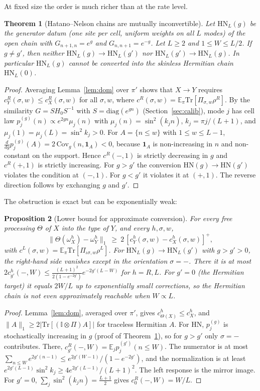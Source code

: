 \documentclass[11pt]{article}
\newtheorem{theorem}{Theorem}
\newtheorem{proposition}[theorem]{Proposition}
\theoremstyle{definition}
\theoremstyle{remark}
\newcommand{\Tr}{\mathrm{Tr}}
\newcommand{\E}{\mathbb{E}}
\newcommand{\one}{\mathbb{I}}
\newcommand{\isig}{\iota\sigma}
\begin{document}
At fixed size the order is much richer than at the rate level.

\begin{theorem}[Hatano--Nelson chains are mutually inconvertible]\label{thm:HNinc}
Let $\mathrm{HN}_L(g)$ be the generator datum (one site per cell, uniform weights on all $L$ modes) of the open chain with $G_{n+1,n}=e^{g}$ and $G_{n,n+1}=e^{-g}$. Let $L\ge2$ and $1\le W\le L/2$. If $g\ne g'$, then neither $\mathrm{HN}_L(g)\to\mathrm{HN}_L(g')$ nor $\mathrm{HN}_L(g')\to\mathrm{HN}_L(g)$. In particular $\mathrm{HN}_L(g)$ cannot be converted into the skinless Hermitian chain $\mathrm{HN}_L(0)$.
\end{theorem}
\begin{proof}
Averaging Lemma~\ref{lem:dom} over $\pi'$ shows that $X\to Y$ requires $c^R_Y(\sigma,w)\le c^R_X(\sigma,w)$ for all $\sigma,w$, where $c^R(\sigma,w)=\E_\pi\Tr[\Pi_{\sigma,w}\rho^R]$. By the similarity $G=SH_0S^{-1}$ with $S=\mathrm{diag}(e^{gn})$ (Section~\ref{sec:calib}), mode $j$ has cell law $p^{(g)}_j(n)\propto e^{2gn}\mu_j(n)$ with $\mu_j(n)=\sin^2(k_jn)$, $k_j=\pi j/(L+1)$, and $\mu_j(1)=\mu_j(L)=\sin^2k_j>0$. For $A=\{n\le w\}$ with $1\le w\le L-1$, $\frac{d}{dg}p^{(g)}_j(A)=2\,\mathrm{Cov}_g(n,\mathbf 1_A)<0$, because $\mathbf 1_A$ is non-increasing in $n$ and non-constant on the support. Hence $c^R(-,1)$ is strictly decreasing in $g$ and $c^R(+,1)$ is strictly increasing. For $g>g'$ the conversion $\mathrm{HN}(g)\to\mathrm{HN}(g')$ violates the condition at $(-,1)$. For $g<g'$ it violates it at $(+,1)$. The reverse direction follows by exchanging $g$ and $g'$.
\end{proof}

The obstruction is exact but can be exponentially weak:

\begin{proposition}[Lower bound for approximate conversion]\label{prop:approx}
For every free processing $\Theta$ of $X$ into the type of $Y$, and every $h,\sigma,w$,
\[
\|\Theta(\omega^h_X)-\omega^h_Y\|_1\ \ge\ 2\,[c^h_Y(\sigma,w)-c^h_X(\sigma,w)]^+ ,
\]
with $c^L(\sigma,w)=\E_\pi\Tr[\Pi_{\isig,w}\rho^L]$. For $\mathrm{HN}_L(g)\to\mathrm{HN}_L(g')$ with $g>g'>0$, the right-hand side vanishes except in the orientation $\sigma=-$. There it is at most $2c^h_{g'}(-,W)\le\frac{(L+1)^2}{2(1-e^{-2g'})}e^{-2g'(L-W)}$ for $h=R,L$. For $g'=0$ (the Hermitian target) it equals $2W/L$ up to exponentially small corrections, so the Hermitian chain is not even approximately reachable when $W\propto L$.
\end{proposition}
\begin{proof}
Lemma~\ref{lem:dom}, averaged over $\pi'$, gives $c^h_{\Theta(X)}\le c^h_X$, and $\|A\|_1\ge2|\Tr[(\one\otimes\Pi)A]|$ for traceless Hermitian $A$. For HN, $p^{(g)}_j$ is stochastically increasing in $g$ (proof of Theorem~\ref{thm:HNinc}), so for $g>g'$ only $\sigma=-$ contributes. There, $c^R_{g'}(-,W)=\E_jp^{(g')}_j(n\le W)$. The numerator is at most $\sum_{n\le W}e^{2g'(n-1)}\le e^{2g'(W-1)}/(1-e^{-2g'})$, and the normalization is at least $e^{2g'(L-1)}\sin^2k_j\ge4e^{2g'(L-1)}/(L+1)^2$. The left response is the mirror image. For $g'=0$, $\sum_j\sin^2(k_jn)=\frac{L+1}2$ gives $c^R_0(-,W)=W/L$.
\end{proof}
\end{document}
